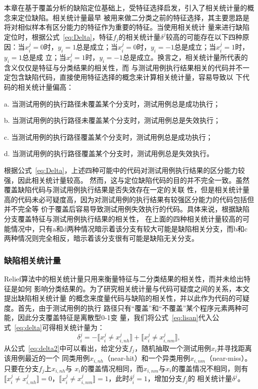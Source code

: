 本章在基于覆盖分析的缺陷定位基础上，受特征选择启发，引入了相关统计量的概念来定位缺陷。相关统计量最早
被用来做二分类之前的特征选择，其主要思路是将对相似样本有区分能力的特征作为重要的特征。当使用相关统计
量来进行缺陷定位时，根据公式~\eqref{eq:Delta}，特征$f_j$的相关统计量$\delta^j$较高的可能存在以下四种原
因：当$x_i^j=0$时，$y_i=1$总是成立；当$x_i^j=0$时，$y_i=-1$总是成立；当$x_i^j=1$时，$y_i=1$总是成
立；当$x_i^j=1$时，$y_i=-1$总是成立。换言之，相关统计量所代表的含义仅仅是特征与分类结果的相关性，而
与测试用例执行结果相关的代码并不一定包含缺陷代码，直接使用特征选择的概念来计算相关统计量，容易导致以
下代码的相关统计量偏高：

a. 当测试用例的执行路径未覆盖某个分支时，测试用例总是成功执行；

b. 当测试用例的执行路径未覆盖某个分支时，测试用例总是失效执行；

c. 当测试用例的执行路径覆盖某个分支时，测试用例总是成功执行；

d. 当测试用例的执行路径覆盖某个分支时，测试用例总是失效执行。

根据公式~\ref{eq:Delta}，上述四种可能中的代码对测试用例执行结果的区分能力较强，因此相关统计量较高。
然而，这与定位缺陷代码的目的并不完全一致。虽然覆盖缺陷代码与测试用例执行结果是否失效存在一定的关联
性，但是相关统计量高的代码未必可疑度高，因为对测试用例的执行结果有较强区分能力的代码包括但并不完全等
价于覆盖后容易导致测试用例失效执行的代码。具体来说，根据缺陷分支覆盖特征与测试用例执行结果的相关性，
在上面的四种相关统计量较高的可能情况中，只有a和d两种情况暗示着该分支有较大可能是缺陷相关分支，而b和c
两种情况则完全相反，暗示着该分支很有可能是缺陷无关分支。

\subsubsection{缺陷相关统计量}

Relief算法中的相关统计量只用来衡量特征与二分类结果的相关性，而并未给出特征是如何
影响分类结果的。为了研究相关统计量与代码可疑度之间的关系，本文提出缺陷相关统计量
的概念来度量代码与缺陷的相关性，并以此作为代码的可疑度。首先，由于测试用例的执行
路径只有``覆盖''和``不覆盖''某个程序元素两种可能，因此分支覆盖特征是离散型0-1变
量，我们将公式~\eqref{eq:lisan}代入公式~\eqref{eq:delta}可得相关统计量为：
\begin{equation}
       \delta^j_i = -\llbracket x_i^j \neq x_{i,nh}^j \rrbracket + \llbracket x_i^j \neq x_{i,nm}^j \rrbracket, \label{eq:delta2}
\end{equation}
从公式~\eqref{eq:delta2}中可以看出，给定分支$f_j$，随机抽取一个测试用例$x_i$并寻找距离该用例最近的一个
同类用例$x_{i,nh}$（near-hit）和一个异类用例$x_{i,nm}$（near-miss）。只要在分支$f_j$上$x_{i,nh}$与
$x_i$的覆盖情况相同，而$x_{i,nm}$与$x_i$的覆盖情况不相同，则有$\llbracket x_i^j \neq x_{i,nh}^j
\rrbracket=0$，$\llbracket x_i^j \neq x_{i,nm}^j \rrbracket=1$，此时$\delta_i^j=1$，增加分支$f_j$的
相关统计量$\delta^j$。

